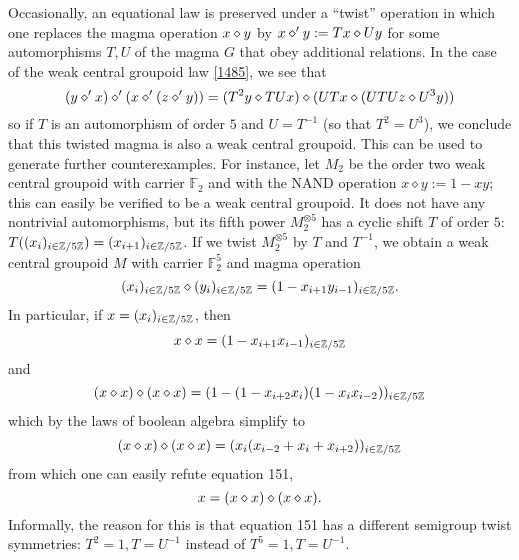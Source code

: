 Occasionally, an equational law is preserved under a ``twist'' operation in which one replaces the magma operation $x \diamond y$ by $x \diamond' y := Tx \diamond Uy$ for some automorphisms $T,U$ of the magma $G$ that obey additional relations.  In the case of the weak central groupoid law \eqref{1485}, we see that
$$
(y \diamond' x) \diamond' (x \diamond' (z \diamond' y))= (T^2 y \diamond TUx) \diamond (UTx \diamond (UTUz \diamond U^3y))$$
so if $T$ is an automorphism of order $5$ and $U = T^{-1}$ (so that $T^2 = U^3$), we conclude that this twisted magma is also a weak central groupoid.  This can be used to generate further counterexamples.  For instance, let $M_2$ be the order two weak central groupoid with carrier ${\mathbb F}_2$ and with the NAND operation $x \diamond y := 1 - xy$; this can easily be verified to be a weak central groupoid.  It does not have any nontrivial automorphisms, but its fifth power $M_2^{\otimes 5}$ has a cyclic shift $T$ of order $5$: $T( (x_i)_{i\in \mathbb{Z}/5\mathbb{Z}} ) = (x_{i+1})_{i \in \mathbb{Z}/5\mathbb{Z}}$.  If we twist $M_2^{\otimes 5}$ by $T$ and $T^{-1}$, we obtain a weak central groupoid $M$ with carrier ${\mathbb F}_2^5$ and magma operation
$$(x_i)_{i\in \mathbb{Z}/5\mathbb{Z}} \diamond (y_i)_{i\in \mathbb{Z}/5\mathbb{Z}} = (1 - x_{i+1} y_{i-1})_{i \in \mathbb{Z}/5\mathbb{Z}}.$$
In particular, if $x = (x_i)_{i\in \mathbb{Z}/5\mathbb{Z}}$, then
$$ x \diamond x = (1 - x_{i+1} x_{i-1})_{i \in \mathbb{Z}/5\mathbb{Z}}$$
and
$$ (x \diamond x) \diamond (x \diamond x) = (1 - (1 - x_{i+2} x_{i}) (1 - x_i x_{i-2}) )_{i \in \mathbb{Z}/5\mathbb{Z}}$$
which by the laws of boolean algebra simplify to
$$ (x \diamond x) \diamond (x \diamond x) = (x_i (x_{i-2} + x_i + x_{i+2}))_{i \in \mathbb{Z}/5\mathbb{Z}}$$
from which one can easily refute equation 151,
$$ x = (x \diamond x) \diamond (x \diamond x).$$
Informally, the reason for this is that equation 151 has a different semigroup twist symmetries: $T^2 = 1, T = U^{-1}$ instead of $T^5 = 1, T = U^{-1}$.
